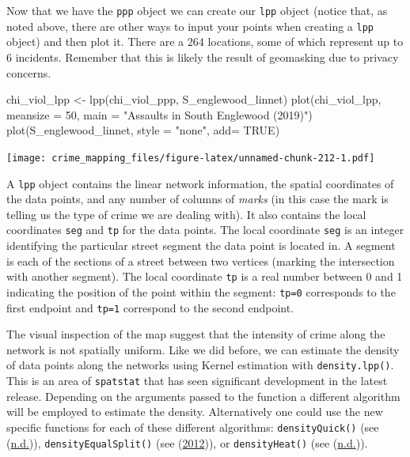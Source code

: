 \documentclass[
  krantz2]{krantz}
\makeatletter
\newenvironment{Shaded}{\begin{snugshade}}{\end{snugshade}}
\newcommand{\AttributeTok}[1]{\textcolor[rgb]{0.61,0.61,0.61}{#1}}
\newcommand{\ConstantTok}[1]{\textcolor[rgb]{0,0,0}{#1}}
\newcommand{\DecValTok}[1]{\textcolor[rgb]{0.06,0.06,0.06}{#1}}
\newcommand{\FunctionTok}[1]{\textcolor[rgb]{0,0,0}{#1}}
\newcommand{\NormalTok}[1]{#1}
\newcommand{\OtherTok}[1]{\textcolor[rgb]{0.37,0.37,0.37}{#1}}
\newcommand{\StringTok}[1]{\textcolor[rgb]{0.5,0.5,0.5}{#1}}
\newenvironment{kframe}{%
\medskip{}
\setlength{\fboxsep}{.8em}
 \def\at@end@of@kframe{}%
 \ifinner\ifhmode%
  \def\at@end@of@kframe{\end{minipage}}%
  \begin{minipage}{\columnwidth}%
 \fi\fi%
 \def\FrameCommand##1{\hskip\@totalleftmargin \hskip-\fboxsep
 \colorbox{shadecolor}{##1}\hskip-\fboxsep
     \hskip-\linewidth \hskip-\@totalleftmargin \hskip\columnwidth}%
 \MakeFramed {\advance\hsize-\width
   \@totalleftmargin\z@ \linewidth\hsize
   \@setminipage}}%
 {\par\unskip\endMakeFramed%
 \at@end@of@kframe}
\renewenvironment{Shaded}{\begin{kframe}}{\end{kframe}}
\makeatother
\begin{document}
Now that we have the \texttt{ppp} object we can create our \texttt{lpp} object (notice that, as noted above, there are other ways to input your points when creating a \texttt{lpp} object) and then plot it. There are a 264 locations, some of which represent up to 6 incidents. Remember that this is likely the result of geomasking due to privacy concerns.

\begin{Shaded}
\begin{Highlighting}[]
\NormalTok{chi\_viol\_lpp }\OtherTok{\textless{}{-}} \FunctionTok{lpp}\NormalTok{(chi\_viol\_ppp, S\_englewood\_linnet)}
\FunctionTok{plot}\NormalTok{(chi\_viol\_lpp, }\AttributeTok{meansize =} \DecValTok{50}\NormalTok{, }\AttributeTok{main =} \StringTok{"Assaults in South Englewood (2019)"}\NormalTok{)}
\FunctionTok{plot}\NormalTok{(S\_englewood\_linnet, }\AttributeTok{style =} \StringTok{"none"}\NormalTok{, }\AttributeTok{add=} \ConstantTok{TRUE}\NormalTok{)}
\end{Highlighting}
\end{Shaded}

\texttt{[image: crime\_mapping\_files/figure-latex/unnamed-chunk-212-1.pdf]}

A \texttt{lpp} object contains the linear network information, the spatial coordinates of the data points, and any number of columns of \emph{marks} (in this case the mark is telling us the type of crime we are dealing with). It also contains the local coordinates \texttt{seg} and \texttt{tp} for the data points. The local coordinate \texttt{seg} is an integer identifying the particular street segment the data point is located in. A segment is each of the sections of a street between two vertices (marking the intersection with another segment). The local coordinate \texttt{tp} is a real number between 0 and 1 indicating the position of the point within the segment: \texttt{tp=0} corresponds to the first endpoint and \texttt{tp=1} correspond to the second endpoint.

The visual inspection of the map suggest that the intensity of crime along the network is not spatially uniform. Like we did before, we can estimate the density of data points along the networks using Kernel estimation with \texttt{density.lpp()}. This is an area of \texttt{spatstat} that has seen significant development in the latest release. Depending on the arguments passed to the function a different algorithm will be employed to estimate the density. Alternatively one could use the new specific functions for each of these different algorithms: \texttt{densityQuick()} (see (\protect\hyperlink{ref-Rakshit_2019}{n.d.})), \texttt{densityEqualSplit()} (see (\protect\hyperlink{ref-Okabe_2012}{2012})), or \texttt{densityHeat()} (see (\protect\hyperlink{ref-McSwiggan_2016}{n.d.})).
\end{document}
